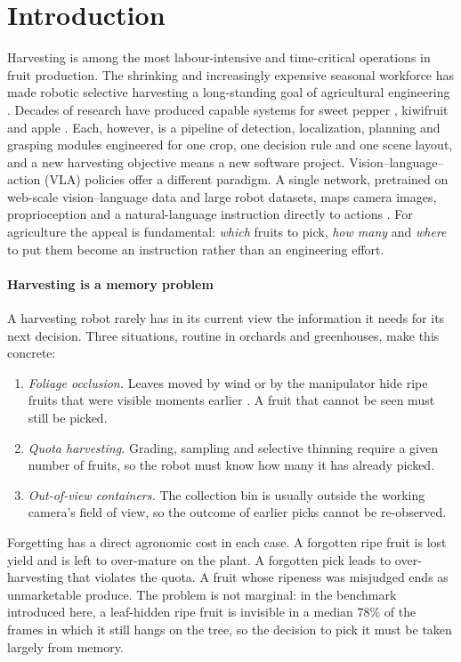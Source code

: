 \section{Introduction}
\label{sec:intro}

Harvesting is among the most labour-intensive and time-critical operations in fruit production. The shrinking and increasingly expensive seasonal workforce has made robotic selective harvesting a long-standing goal of agricultural engineering \citep{bac2014harvesting,kootstra2021selective,zhou2022intelligent}. Decades of research have produced capable systems for sweet pepper \citep{arad2020sweetpepper}, kiwifruit \citep{williams2019kiwifruit} and apple \citep{silwal2017apple}. Each, however, is a pipeline of detection, localization, planning and grasping modules engineered for one crop, one decision rule and one scene layout, and a new harvesting objective means a new software project. Vision--language--action (VLA) policies offer a different paradigm. A single network, pretrained on web-scale vision--language data and large robot datasets, maps camera images, proprioception and a natural-language instruction directly to actions \citep{brohan2023rt2,kim2024openvla,black2024pi0,pi05_2025}. For agriculture the appeal is fundamental: \emph{which} fruits to pick, \emph{how many} and \emph{where} to put them become an instruction rather than an engineering effort.

\paragraph{Harvesting is a memory problem} A harvesting robot rarely has in its current view the information it needs for its next decision. Three situations, routine in orchards and greenhouses, make this concrete:
\begin{enumerate}
\item \emph{Foliage occlusion.} Leaves moved by wind or by the manipulator hide ripe fruits that were visible moments earlier \citep{hemming2014detectability}. A fruit that cannot be seen must still be picked.
\item \emph{Quota harvesting.} Grading, sampling and selective thinning require a given number of fruits, so the robot must know how many it has already picked.
\item \emph{Out-of-view containers.} The collection bin is usually outside the working camera's field of view, so the outcome of earlier picks cannot be re-observed.
\end{enumerate}
Forgetting has a direct agronomic cost in each case. A forgotten ripe fruit is lost yield and is left to over-mature on the plant. A forgotten pick leads to over-harvesting that violates the quota. A fruit whose ripeness was misjudged ends as unmarketable produce. The problem is not marginal: in the benchmark introduced here, a leaf-hidden ripe fruit is invisible in a median 78\% of the frames in which it still hangs on the tree, so the decision to pick it must be taken largely from memory.

